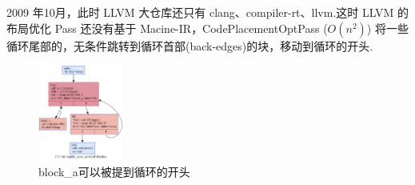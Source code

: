 2009 年10月，此时 LLVM 大仓库还只有 clang、compiler-rt、llvm.这时 LLVM 的布局优化 Pass 还没有基于 Macine-IR，CodePlacementOptPass ($O(n^2)$) \cite{llvmcodeplacementopt2009}将一些循环尾部的，无条件跳转到循环首部(back-edges)的块，移动到循环的开头.

\begin{figure}
    \centering
    \includegraphics[width=0.25\textwidth]{images/slightly_more_involved.png}
    \caption{block\_a可以被提到循环的开头}
\end{figure}